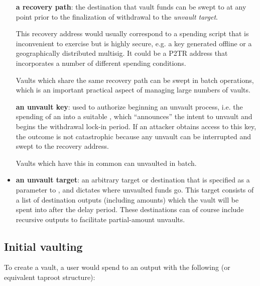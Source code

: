 \documentclass[10pt]{article}
\begin{document}
\begin{itemize}

  \begin{item}
    \textbf{a recovery path}: the destination that vault funds can be swept to
    at any point prior to the finalization of withdrawal to the \emph{unvault target}.

    This recovery address would usually correspond to a spending script that is
    inconvenient to exercise but is highly secure, e.g. a key generated offline or a
    geographically distributed multisig. It could be a P2TR address that incorporates a
    number of different spending conditions. 

    Vaults which share the same recovery path can be swept in batch operations, which
    is an important practical aspect of managing large numbers of vaults.

  \end{item}

  \begin{item} 
    \textbf{an unvault key}: used to authorize beginning an unvault process,
    i.e. the spending of an \opv{} into a suitable \opuv{}, which ``announces'' the
    intent to unvault and begins the withdrawal
    lock-in period. If an attacker obtains access to this key, the outcome is not
    catastrophic because any unvault can be interrupted and swept to the recovery
    address. 

    Vaults which have this in common can unvaulted in batch.
    
  \end{item}

  \item \textbf{an unvault target}: an arbitrary target or destination that is
    specified as a parameter to \opuv{}, and dictates where unvaulted funds go. This
    target consists of a list of destination outputs (including amounts) which the
    vault will be spent into after the delay period. These destinations can of course
    include recursive \opv{} outputs to facilitate partial-amount unvaults.

\end{itemize}

\subsection*{Initial vaulting}

To create a vault, a user would spend to an output with the following
\spk{} (or equivalent taproot structure):
\end{document}
